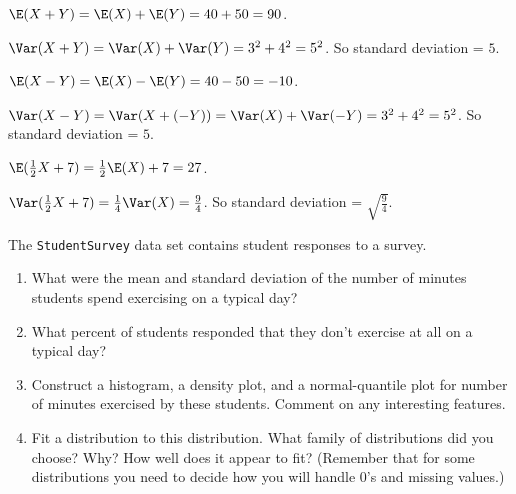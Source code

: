 \documentclass[twoside]{book}\usepackage[]{graphicx}\usepackage[]{xcolor}
\newcommand{\Rindex}[1]{\index{\texttt{#1}}}
\newcommand{\dataframe}[1]{{\color{blue!80!black}\texttt{#1}}\Rindex{#1}}
\begin{document}
\begin{solution}
$\E(X+Y) = \E(X) + \E(Y) = 40 + 50 = 90$.

$\Var(X+Y) = \Var(X) + \Var(Y) = 3^2 + 4^2 = 5^2$.
So standard deviation = $5$.

$\E(X-Y) = \E(X) - \E(Y) = 40 - 50 = -10$.

$\Var(X-Y) = \Var(X + (-Y)) = \Var(X) + \Var(-Y) = 3^2 + 4^2 = 5^2$.
So standard deviation = $5$.

$\E(\frac12 X+7) = \frac12\E(X) + 7 = 27$.

$\Var(\frac12 X+7) = \frac14\Var(X) = \frac94$.
So standard deviation = $\sqrt{\frac94}$.
\end{solution}


\iffalse
\begin{problem}
	The \dataframe{StudentSurvey} data set 
	contains student responses to a survey.
	\begin{enumerate}
		\item
			What were the mean and standard deviation of the number 
			of minutes students spend exercising on a typical day?
		\item
			What percent of students responded that they don't exercise
			at all on a typical day?
		\item
			Construct a histogram, a density plot, and a normal-quantile
			plot for number of minutes exercised by these students.
			Comment on any interesting features.
		\item
			Fit a distribution to this distribution.  What family of distributions
			did you choose?  Why?  How well does it appear to fit?
			(Remember that for some distributions you need to decide how you will
			handle 0's and missing values.)
	\end{enumerate}
\end{problem}
\end{document}
